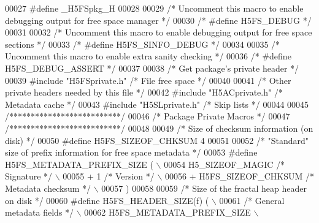 \begin{DoxyCode}
00027 \textcolor{preprocessor}{#define \_H5FSpkg\_H}
00028 
00029 \textcolor{comment}{/* Uncomment this macro to enable debugging output for free space manager */}
00030 \textcolor{comment}{/* #define H5FS\_DEBUG */}
00031 
00032 \textcolor{comment}{/* Uncomment this macro to enable debugging output for free space sections */}
00033 \textcolor{comment}{/* #define H5FS\_SINFO\_DEBUG */}
00034 
00035 \textcolor{comment}{/* Uncomment this macro to enable extra sanity checking */}
00036 \textcolor{comment}{/* #define H5FS\_DEBUG\_ASSERT */}
00037 
00038 \textcolor{comment}{/* Get package's private header */}
00039 \textcolor{preprocessor}{#include "H5FSprivate.h"}    \textcolor{comment}{/* File free space                      */}
00040 
00041 \textcolor{comment}{/* Other private headers needed by this file */}
00042 \textcolor{preprocessor}{#include "H5ACprivate.h"}    \textcolor{comment}{/* Metadata cache                       */}
00043 \textcolor{preprocessor}{#include "H5SLprivate.h"}    \textcolor{comment}{/* Skip lists                           */}
00044 
00045 \textcolor{comment}{/**************************/}
00046 \textcolor{comment}{/* Package Private Macros */}
00047 \textcolor{comment}{/**************************/}
00048 
00049 \textcolor{comment}{/* Size of checksum information (on disk) */}
00050 \textcolor{preprocessor}{#define H5FS\_SIZEOF\_CHKSUM      4}
00051 
00052 \textcolor{comment}{/* "Standard" size of prefix information for free space metadata */}
00053 \textcolor{preprocessor}{#define H5FS\_METADATA\_PREFIX\_SIZE (                                           \(\backslash\)}
00054 \textcolor{preprocessor}{    H5\_SIZEOF\_MAGIC   }\textcolor{comment}{/* Signature */}\textcolor{preprocessor}{                                         \(\backslash\)}
00055 \textcolor{preprocessor}{    + 1 }\textcolor{comment}{/* Version */}\textcolor{preprocessor}{                                                         \(\backslash\)}
00056 \textcolor{preprocessor}{    + H5FS\_SIZEOF\_CHKSUM }\textcolor{comment}{/* Metadata checksum */}\textcolor{preprocessor}{                              \(\backslash\)}
00057 \textcolor{preprocessor}{    )}
00058 
00059 \textcolor{comment}{/* Size of the fractal heap header on disk */}
00060 \textcolor{preprocessor}{#define H5FS\_HEADER\_SIZE(f) (                                                 \(\backslash\)}
00061 \textcolor{preprocessor}{    }\textcolor{comment}{/* General metadata fields */}\textcolor{preprocessor}{                                             \(\backslash\)}
00062 \textcolor{preprocessor}{    H5FS\_METADATA\_PREFIX\_SIZE                                                 \(\backslash\)}

\end{DoxyCode}

